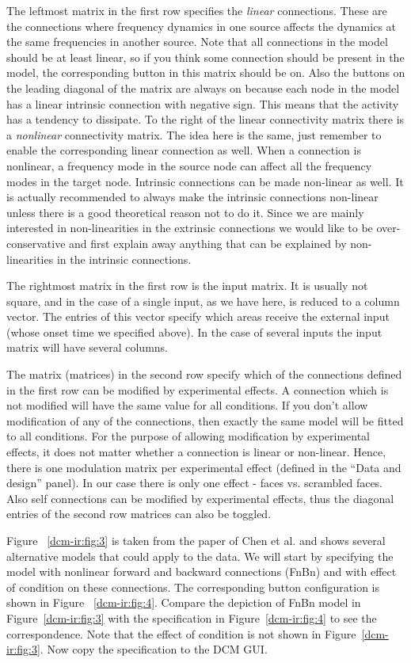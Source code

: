 The leftmost matrix in the first row specifies the \textit{linear} connections. These are the connections where frequency dynamics in one source affects the dynamics at the same frequencies in another source. Note that all connections in the model should be at least linear, so if you think some connection should be present in the model, the corresponding button in this matrix should be on. Also the buttons on the leading diagonal of the matrix are always on because each node in the model has a linear  intrinsic connection with negative sign. This means that the activity has a tendency to dissipate. To the right of the linear connectivity matrix there is a \textit{nonlinear} connectivity matrix. The idea here is the same, just remember to enable the corresponding linear connection as well. When a connection is nonlinear, a frequency mode in the source node can affect all the frequency modes in the target node. Intrinsic connections can be made non-linear as well. It is actually recommended to always make the intrinsic connections non-linear unless there is a good theoretical reason not to do it. Since we are mainly interested in non-linearities in the extrinsic connections we would like to be over-conservative and first explain away anything that can be explained by non-linearities in the intrinsic connections.

The rightmost matrix in the first row is the input matrix. It is usually not square, and in the case of a single input, as we have here, is reduced to a column vector. The entries of this vector specify which areas receive the external input (whose onset time we specified above). In the case of several inputs the input matrix will have several columns.

The matrix (matrices) in the second row specify which of the connections defined in the first row can be modified by experimental effects. A connection which is not modified will have the same value for all conditions. If you don't allow modification of any of the connections, then exactly the same model will be fitted to all conditions. For the purpose of allowing modification by experimental effects, it does not matter whether a connection is linear or non-linear. Hence, there is one modulation matrix per experimental effect (defined in the ``Data and design'' panel). In our case there is only one effect - faces vs. scrambled faces. Also self connections can be modified by experimental effects, thus the diagonal entries of the second row matrices can also be toggled.

Figure ~\ref{dcm-ir:fig:3} is taken from the paper of Chen et al. \cite{cc_asymm} and shows several alternative models that could apply to the data. We will start by specifying the model with nonlinear forward and backward connections (FnBn) and with effect of condition on these connections. The corresponding button configuration is shown in Figure ~\ref{dcm-ir:fig:4}. Compare the depiction of FnBn model in Figure~\ref{dcm-ir:fig:3}  with the specification in Figure~\ref{dcm-ir:fig:4}  to see the correspondence. Note that the effect of condition is not shown in Figure~\ref{dcm-ir:fig:3}. Now copy the specification to the DCM GUI.

